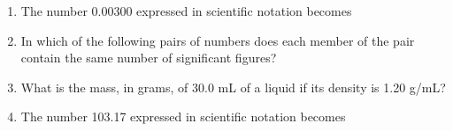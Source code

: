 \documentclass[main.tex]{subfiles}
\begin{document}
\begin{fullwidth}
\begin{multicols*}{2}
\begin{enumerate}
\item The number 0.00300 expressed in scientific notation becomes
\begin{enumerate}[label=(\alph*)]\vspace{-0.5cm}
\end{enumerate}

\item In which of the following pairs of numbers does each member of the pair contain the same number of significant figures?
\begin{enumerate}[label=(\alph*)]\vspace{-0.5cm}
\end{enumerate}


\item What is the mass, in grams, of 30.0 mL of a liquid if its density is 1.20 g/mL?
\begin{enumerate}[label=(\alph*)]\vspace{-0.5cm}
\end{enumerate}

\item The number 103.17 expressed in scientific notation becomes
\begin{enumerate}[label=(\alph*)]\vspace{-0.5cm}
\end{enumerate}


\end{enumerate}
\end{multicols*}
\end{fullwidth}
\end{document}

